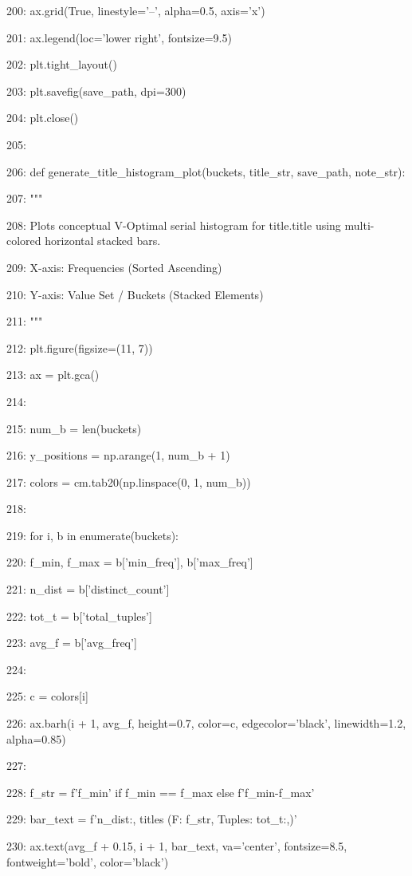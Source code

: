 \documentclass[11pt,a4paper]{article}
\begin{document}
200:     ax.grid(True, linestyle='--', alpha=0.5, axis='x')

201:     ax.legend(loc='lower right', fontsize=9.5)

202:     plt.tight\_layout()

203:     plt.savefig(save\_path, dpi=300)

204:     plt.close()

205:

206: def generate\_title\_histogram\_plot(buckets, title\_str, save\_path, note\_str):

207:     """

208:     Plots conceptual V-Optimal serial histogram for title.title using multi-colored horizontal stacked bars.

209:     X-axis: Frequencies (Sorted Ascending)

210:     Y-axis: Value Set / Buckets (Stacked Elements)

211:     """

212:     plt.figure(figsize=(11, 7))

213:     ax = plt.gca()

214:

215:     num\_b = len(buckets)

216:     y\_positions = np.arange(1, num\_b + 1)

217:     colors = cm.tab20(np.linspace(0, 1, num\_b))

218:

219:     for i, b in enumerate(buckets):

220:         f\_min, f\_max = b['min\_freq'], b['max\_freq']

221:         n\_dist = b['distinct\_count']

222:         tot\_t = b['total\_tuples']

223:         avg\_f = b['avg\_freq']

224:

225:         c = colors[i]

226:         ax.barh(i + 1, avg\_f, height=0.7, color=c, edgecolor='black', linewidth=1.2, alpha=0.85)

227:

228:         f\_str = f'{f\_min}' if f\_min == f\_max else f'{f\_min}-{f\_max}'

229:         bar\_text = f'{n\_dist:,} titles (F: {f\_str}, Tuples: {tot\_t:,})'

230:         ax.text(avg\_f + 0.15, i + 1, bar\_text, va='center', fontsize=8.5, fontweight='bold', color='black')
\end{document}
